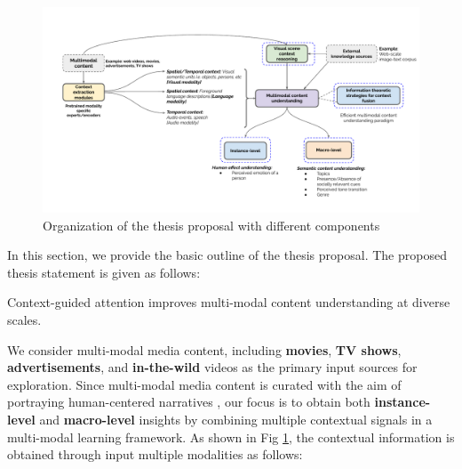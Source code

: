 \begin{figure}[h!]
    \centering
        \includegraphics[width=\textwidth]{figures/Proposal_organization.pdf}
        \caption{Organization of the thesis proposal with different components}
        \label{proposalorganization}
\end{figure}

In this section, we provide the basic outline of the thesis proposal. The proposed thesis statement is given as follows:

\begin{tcolorbox}[width=\textwidth]
Context-guided attention improves multi-modal content understanding at diverse scales.
\end{tcolorbox}

We consider multi-modal media content, including \textbf{movies}, \textbf{TV shows}, \textbf{advertisements}, and \textbf{in-the-wild} videos as the primary input sources for exploration. Since multi-modal media content is curated with the aim of portraying human-centered narratives \cite{CMI}, our focus is to obtain both \textbf{instance-level} and \textbf{macro-level} insights by combining multiple contextual signals in a multi-modal learning framework. As shown in Fig \ref{proposalorganization}, the contextual information is obtained through input multiple modalities as follows:

